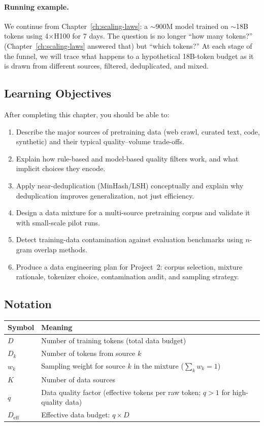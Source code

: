 \paragraph{Running example.} We continue from Chapter~\ref{ch:scaling-laws}: a $\sim$900M model trained on $\sim$18B tokens using 4$\times$H100 for 7 days. The question is no longer ``how many tokens?'' (Chapter~\ref{ch:scaling-laws} answered that) but ``which tokens?'' At each stage of the funnel, we will trace what happens to a hypothetical 18B-token budget as it is drawn from different sources, filtered, deduplicated, and mixed.


\subsection*{Learning Objectives}

After completing this chapter, you should be able to:

\begin{enumerate}
  \item Describe the major sources of pretraining data (web crawl, curated text, code, synthetic) and their typical quality--volume trade-offs.
  \item Explain how rule-based and model-based quality filters work, and what implicit choices they encode.
  \item Apply near-deduplication (MinHash/LSH) conceptually and explain why deduplication improves generalization, not just efficiency.
  \item Design a data mixture for a multi-source pretraining corpus and validate it with small-scale pilot runs.
  \item Detect training-data contamination against evaluation benchmarks using $n$-gram overlap methods.
  \item Produce a data engineering plan for Project~2: corpus selection, mixture rationale, tokenizer choice, contamination audit, and sampling strategy.
\end{enumerate}


\subsection*{Notation}

\begin{center}
\begin{tabularx}{\textwidth}{@{}lX@{}}
\toprule
\textbf{Symbol} & \textbf{Meaning} \\
\midrule
$D$ & Number of training tokens (total data budget) \\
$D_k$ & Number of tokens from source $k$ \\
$w_k$ & Sampling weight for source $k$ in the mixture ($\sum_k w_k = 1$) \\
$K$ & Number of data sources \\
$q$ & Data quality factor (effective tokens per raw token; $q > 1$ for high-quality data) \\
$D_{\text{eff}}$ & Effective data budget: $q \times D$ \\
\bottomrule
\end{tabularx}
\end{center}


